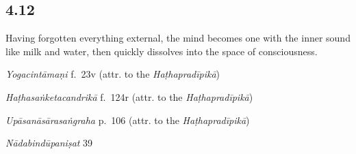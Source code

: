 \begin{ekdosis}

\subsection*{4.12}
\begin{translation}[hp04_012]
Having forgotten everything external, the mind becomes one with the inner sound like milk and water, then quickly dissolves into the space of consciousness.
\end{translation}


\begin{testimonia}[hp04_012]
\emph{Yogacintāmaṇi} f.~23v (attr. to the \emph{Haṭhapradīpikā})
\begin{versinnote}
\end{versinnote}

\emph{Haṭhasaṅketacandrikā} f.~124r (attr. to the \emph{Haṭhapradīpikā})
\begin{versinnote}
\end{versinnote}

\emph{Upāsanāsārasaṅgraha} p.~106 (attr. to the \emph{Haṭhapradīpikā})
\begin{versinnote}
\end{versinnote}

\emph{Nādabindūpaniṣat} 39
\begin{versinnote}
\end{versinnote}
\end{testimonia}



\end{ekdosis}
